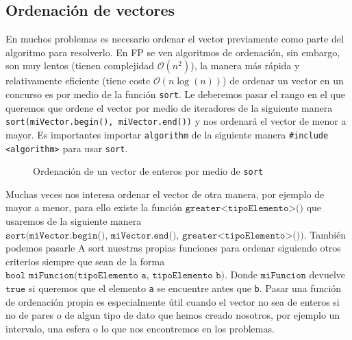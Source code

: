 \documentclass{article}
\begin{document}
    \subsection{Ordenación de vectores}
    En muchos problemas es necesario ordenar el vector previamente como parte del algoritmo para resolverlo. 
    En FP se ven algoritmos de ordenación, sin embargo, son muy lentos (tienen complejidad $\mathcal{O}(n^2)$),
    la manera más rápida y relativamente eficiente (tiene coste $\mathcal{O}(n\log(n))$) de ordenar un vector en un concurso es por medio de la función
    \texttt{sort}. Le deberemos pasar el rango en el que queremos que ordene el vector por medio de iteradores de la 
    siguiente manera \texttt{sort(miVector.begin(), miVector.end())} y nos ordenará el vector de menor a mayor. Es importantes
    importar \texttt{algorithm} de la siguiente manera \texttt{\#include <algorithm>} para usar \texttt{sort}.

\begin{figure}[h]
        \centering
        \caption{Ordenación de un vector de enteros por medio de \texttt{sort}}
    \end{figure}

    Muchas veces nos interesa ordenar el vector de otra manera, por ejemplo de mayor a menor, para ello
    existe la función $\texttt{greater<tipoElemento>()}$ que usaremos de la siguiente manera 
    $\texttt{sort(miVector.begin(), miVector.end(), greater<tipoElemento>())}$. También podemos pasarle A
    sort nuestras propias funciones para ordenar siguiendo otros criterios
    siempre que sean de la forma $\texttt{bool miFuncion(tipoElemento a, tipoElemento b)}$. Donde $\texttt{miFuncion}$
    devuelve $ \texttt{true}$ si queremos que el elemento \texttt{a} se encuentre antes que \texttt{b}. Pasar
    una función de ordenación propia es especialmente útil cuando el vector no sea de enteros si no de pares o de
    algun tipo de dato que hemos creado nosotros, por ejemplo un intervalo, una esfera o lo que nos encontremos en los problemas.
\end{document}
